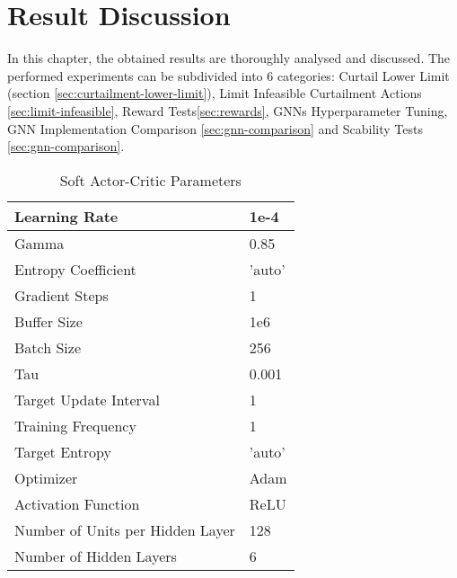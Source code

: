 \chapter{Result Discussion}

In this chapter, the obtained results are thoroughly analysed and discussed. The performed experiments can be subdivided into 6 categories: Curtail Lower Limit (section \ref{sec:curtailment-lower-limit}), Limit Infeasible Curtailment Actions \ref{sec:limit-infeasible}, Reward Tests\ref{sec:rewards}, \acp{GNN} Hyperparameter Tuning, \ac{GNN} Implementation Comparison \ref{sec:gnn-comparison} and Scability Tests \ref{sec:gnn-comparison}.

\begin{comment}
	* Best SAC and GNN parameters
	* Environment Parameters
	* Explain that SAC was used for most experiments as a baseline
	* Explain the non-reproducability of experiements (https://github.com/pytorch/pytorch/issues/50469)
\end{comment}

\begin{table}
	\begin{tabular}{|l | l|}
		\hline
		Learning Rate & 1e-4 \\
		\hline
		Gamma & 0.85 \\
		\hline
		Entropy Coefficient & 'auto' \\
		\hline
		Gradient Steps & 1 \\
		\hline
		Buffer Size & 1e6 \\
		\hline
		Batch Size & 256 \\
		\hline
		Tau & 0.001 \\
		\hline
		Target Update Interval & 1 \\
		\hline
		Training Frequency & 1 \\
		\hline
		Target Entropy & 'auto' \\
		\hline 
		Optimizer & Adam \\
		\hline
		Activation Function & ReLU \\
		\hline
		Number of Units per Hidden Layer & 128 \\
		\hline
		Number of Hidden Layers & 6 \\
		\hline
		\end{tabular}
		\caption{Soft Actor-Critic Parameters}
\end{table}


